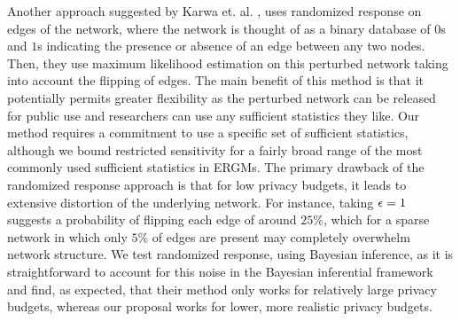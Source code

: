 Another approach suggested by Karwa et. al. \cite{KKS17}, uses randomized response on edges of the network, where the network is thought of as a binary database of $0$s and $1$s indicating the presence or absence of an edge between any two nodes. Then, they use maximum likelihood estimation on this perturbed network taking into account the flipping of edges. The main benefit of this method is that it potentially permits greater flexibility as the perturbed network can be released for public use and researchers can use any sufficient statistics they like. Our method requires a commitment to use a specific set of sufficient statistics, although we bound restricted sensitivity for a fairly broad range of the most commonly used sufficient statistics in ERGMs. The primary drawback of the randomized response approach is that for low privacy budgets, it leads to extensive distortion of the underlying network. For instance, taking $\epsilon =1$ suggests a probability of flipping each edge of around $25\%$, which for a sparse network in which only $5\%$ of edges are present may completely overwhelm network structure. We test randomized response, using Bayesian inference, as it is straightforward to account for this noise in the Bayesian inferential framework and find, as expected, that their method only works for relatively large privacy budgets, whereas our proposal works for lower, more realistic privacy budgets. 



